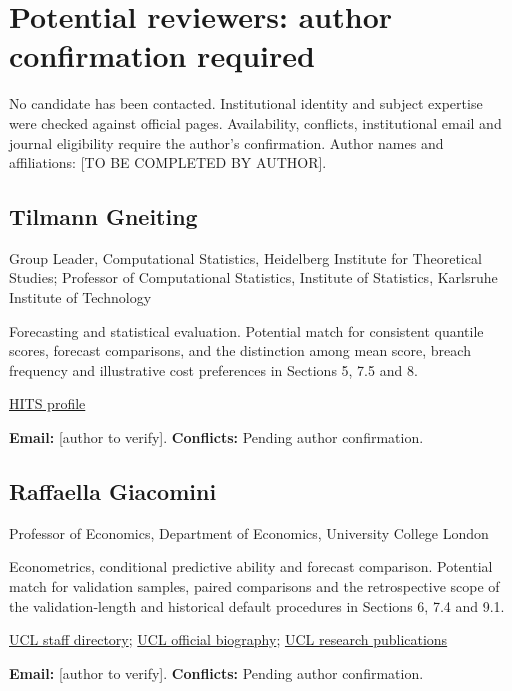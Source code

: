 \documentclass[11pt,a4paper]{article}
\begin{document}
\section*{Potential reviewers: author confirmation required}

No candidate has been contacted. Institutional identity and subject expertise were checked against official pages. Availability, conflicts, institutional email and journal eligibility require the author's confirmation. Author names and affiliations: [TO BE COMPLETED BY AUTHOR].

\subsection*{Tilmann Gneiting}

Group Leader, Computational Statistics, Heidelberg Institute for Theoretical Studies; Professor of Computational Statistics, Institute of Statistics, Karlsruhe Institute of Technology

Forecasting and statistical evaluation. Potential match for consistent quantile scores, forecast comparisons, and the distinction among mean score, breach frequency and illustrative cost preferences in Sections 5, 7.5 and 8.

\href{https://www.h-its.org/people/prof-dr-tilmann-gneiting/}{HITS profile}

\textbf{Email:} [author to verify]. \textbf{Conflicts:} Pending author confirmation.

\subsection*{Raffaella Giacomini}

Professor of Economics, Department of Economics, University College London

Econometrics, conditional predictive ability and forecast comparison. Potential match for validation samples, paired comparisons and the retrospective scope of the validation-length and historical default procedures in Sections 6, 7.4 and 9.1.

\href{https://www.ucl.ac.uk/social-historical-sciences/economics/our-staff/academic-and-teaching-staff}{UCL staff directory}; \href{https://www.ucl.ac.uk/engineering/events/2026/mar/perceived-shocks-and-impulse-responses}{UCL official biography}; \href{https://github-pages.ucl.ac.uk/UCL-Economics-Research/people/raffaella-giacomini/}{UCL research publications}

\textbf{Email:} [author to verify]. \textbf{Conflicts:} Pending author confirmation.
\end{document}
